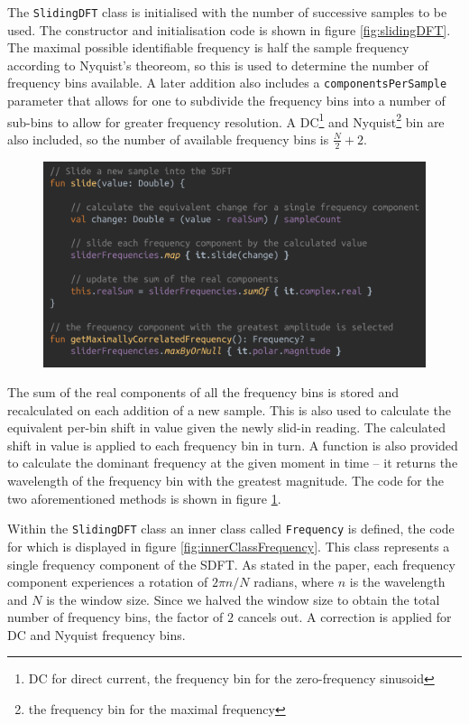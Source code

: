 \documentclass[11pt,twoside,a4paper]{report}
\begin{document}
The \texttt{SlidingDFT} class is initialised with the number of successive samples to be used. The constructor and initialisation code is shown in figure \ref{fig:slidingDFT}. The maximal possible identifiable frequency is half the sample frequency according to Nyquist's theoreom, so this is used to determine the number of frequency bins available. A later addition also includes a \texttt{componentsPerSample} parameter that allows for one to subdivide the frequency bins into a number of sub-bins to allow for greater frequency resolution. A DC\footnote{DC for direct current, the frequency bin for the zero-frequency sinusoid} and Nyquist\footnote{the frequency bin for the maximal frequency} bin are also included, so the number of available frequency bins is $\frac{N}{2} + 2$.

\begin{figure}[h!]
  \centering
  \includegraphics[width=1.0\textwidth]{code-SDFT-slide.png}
  \caption{}
  \label{fig:slideBest}
\end{figure}

The sum of the real components of all the frequency bins is stored and recalculated on each addition of a new sample. This is also used to calculate the equivalent per-bin shift in value given the newly slid-in reading. The calculated shift in value is applied to each frequency bin in turn. A function is also  provided to calculate the dominant frequency at the given moment in time -- it returns the wavelength of the frequency bin with the greatest magnitude. The code for the two aforementioned methods is shown in figure \ref{fig:slideBest}.

Within the \texttt{SlidingDFT} class an inner class called \texttt{Frequency} is defined, the code for which is displayed in figure \ref{fig:innerClassFrequency}. This class represents a single frequency component of the SDFT. As stated in the paper, each frequency component experiences a rotation of $2\pi n / N$ radians, where $n$ is the wavelength and $N$ is the window size. Since we halved the window size to obtain the total number of frequency bins, the factor of $2$ cancels out. A correction is applied for DC and Nyquist frequency bins.
\end{document}
